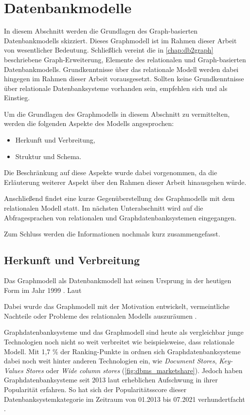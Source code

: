 \section{Datenbankmodelle}
\label{datenmodelle}
In diesem Abschnitt werden die Grundlagen des Graph-basierten Datenbankmodells skizziert. Dieses Graphmodell ist im Rahmen dieser Arbeit von wesentlicher Bedeutung. Schließlich vereint die in \autoref{chap:db2graph} beschriebene Graph-Erweiterung, Elemente des relationalen und Graph-basierten Datenbankmodells. Grundkenntnisse über das relationale Modell werden dabei hingegen im Rahmen dieser Arbeit vorausgesetzt. Sollten keine Grundkenntnisse über relationale Datenbanksysteme vorhanden sein, empfehlen sich \cite{rdbms_book} und \cite{codd_relational_model} als Einstieg.

Um die Grundlagen des Graphmodells in diesem Abschnitt zu vermittelten, werden die folgenden Aspekte des Modells angesprochen:
\begin{itemize}
    \item Herkunft und Verbreitung,
    \item Struktur und Schema.
\end{itemize}
Die Beschränkung auf diese Aspekte wurde dabei vorgenommen, da die Erläuterung weiterer Aspekt über den Rahmen dieser Arbeit hinausgehen würde. 

Anschließend findet eine kurze Gegenüberstellung des Graphmodells mit dem relationalen Modell statt. Im nächsten Unterabschnitt wird auf die Abfragesprachen von relationalen und Graphdatenbanksystemen eingegangen.

Zum Schluss werden die Informationen nochmals kurz zusammengefasst. 

\subsection{Herkunft und Verbreitung}
Das Graphmodell als Datenbankmodell hat seinen Ursprung in der heutigen Form im Jahr 1999 \cite{gdbms}. Laut 

Dabei wurde das Graphmodell mit der Motivation entwickelt, vermeintliche Nachteile oder Probleme des relationalen Modells auszuräumen \cite{gdbms}.

Graphdatenbanksysteme und das Graphmodell sind heute als vergleichbar junge Technologien noch nicht so weit verbreitet wie beispielsweise, dass relationale Modell. Mit 1,7 \% der Ranking-Punkte in \cite{db_engines_ranking_july} ordnen sich Graphdatenbanksysteme dabei noch weit hinter anderen Technologien ein, wie \textit{Document Stores}, \textit{Key-Values Stores} oder \textit{Wide column stores} \cite{db_engines_ranking_july} (\autoref{fig:dbms_marketshare}). Jedoch haben Graphdatenbanksysteme seit 2013 laut \cite{db_engines_ranking_july} erheblichen Aufschwung in ihrer Popularität erfahren. So hat sich der Popularitätsscore dieser Datenbanksystemkategorie im Zeitraum von 01.2013 bis 07.2021 verhundertfacht \cite{db_engines_ranking_july}. 

